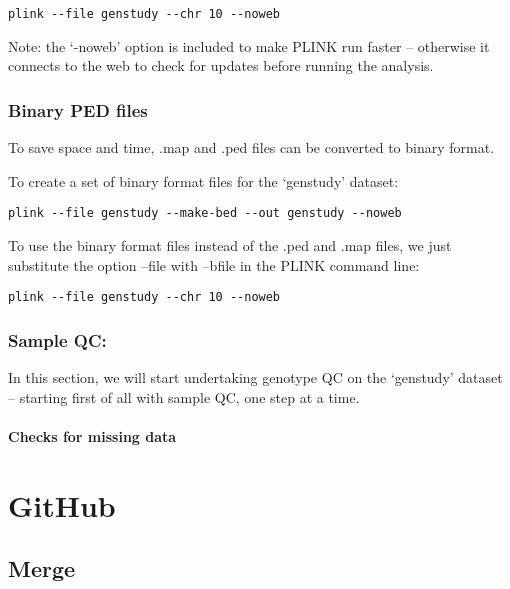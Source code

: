 \documentclass[]{book}
\begin{document}
\begin{verbatim}
plink --file genstudy --chr 10 --noweb
\end{verbatim}

Note: the `-noweb' option is included to make PLINK run faster --
otherwise it connects to the web to check for updates before running the
analysis.

\subsection{Binary PED files}\label{binary-ped-files}

To save space and time, .map and .ped files can be converted to binary
format.

To create a set of binary format files for the `genstudy' dataset:

\begin{verbatim}
plink --file genstudy --make-bed --out genstudy --noweb
\end{verbatim}

To use the binary format files instead of the .ped and .map files, we
just substitute the option --file with --bfile in the PLINK command
line:

\begin{verbatim}
plink --file genstudy --chr 10 --noweb
\end{verbatim}

\subsection{Sample QC:}\label{sample-qc}

In this section, we will start undertaking genotype QC on the `genstudy'
dataset -- starting first of all with sample QC, one step at a time.

\subsubsection{Checks for missing data}\label{checks-for-missing-data}

\chapter{GitHub}\label{github}

\section{Merge}\label{merge}
\end{document}
